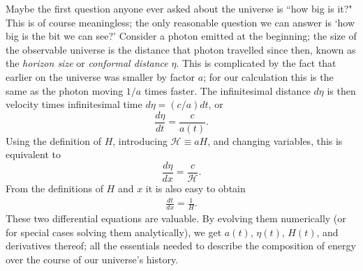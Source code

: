 \documentclass[aps,prl,twocolumn,groupedaddress,nofootinbib]{revtex4-2}
\newcommand{\Hp}{\mathcal{H}}
\newcommand{\der}[2][]{\frac{d#1}{d#2}}
\begin{document}
Maybe the first question anyone ever asked about the universe is ``how big is it?" This is of course meaningless; the only reasonable question we can answer is `how big is the bit we can see?' Consider a photon emitted at the beginning; the size of the observable universe is the distance that photon travelled since then, known as the \textit{horizon size} or \textit{conformal distance} $\eta$. This is complicated by the fact that earlier on the universe was smaller by factor $a$; for our calculation this is the same as the photon moving $1/a$ times faster. The infinitesimal distance $d\eta$ is then velocity times infinitesimal time $d\eta=(c/a)dt$, or
\begin{equation*}
    \der[\eta]{t} = \frac{c}{a(t)}.
\end{equation*}
Using the definition of $H$, introducing $\Hp\equiv aH$, and changing variables, this is equivalent to
\begin{equation}
    \label{eq:eta}
    \der[\eta]{x} = \frac{c}{\Hp}.
\end{equation}
From the definitions of $H$ and $x$ it is also easy to obtain
\begin{align}
    \label{eq:t}
    \frac{dt}{dx} = \frac{1}{H}.
\end{align}
These two differential equations are valuable. By evolving them numerically (or for special cases solving them analytically), we get $a(t)$, $\eta(t)$, $H(t)$, and derivatives thereof; all the essentials needed to describe the composition of energy over the course of our universe's history.
\end{document}
